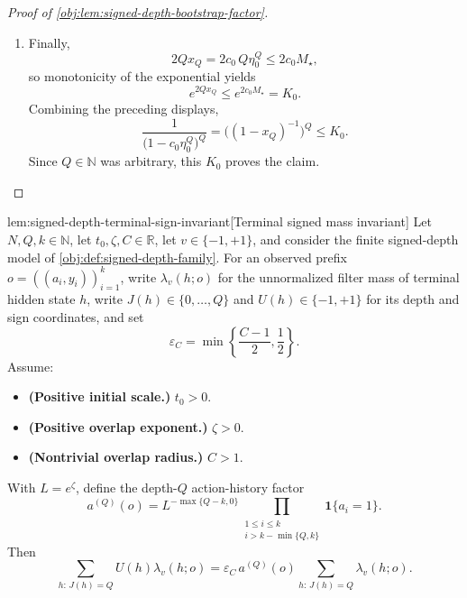\documentclass[11pt]{article}
\begin{document}
\begin{proof}[Proof of \cref{obj:lem:signed-depth-bootstrap-factor}]
\begin{enumerate}
\item Finally,
\[
        2Qx_Q=2c_0\,Q\eta_0^Q\le 2c_0M_\star,
\]
so monotonicity of the exponential yields
\[
        e^{2Qx_Q}\le e^{2c_0M_\star}=K_0.
\]
Combining the preceding displays,
\[
\frac{1}{\bigl(1-c_0\eta_0^Q\bigr)^Q}
=
\bigl((1-x_Q)^{-1}\bigr)^Q
\le
K_0.
\]
Since \(Q\in\mathbb N\) was arbitrary, this \(K_0\) proves the claim. %
\end{enumerate}
\end{proof}

\begin{lemmav}{lem:signed-depth-terminal-sign-invariant}[Terminal signed mass invariant]
Let \(N,Q,k\in\mathbb N\), let \(t_0,\zeta,C\in\mathbb R\), let \(v\in\{-1,+1\}\), and consider the finite signed-depth model of \cref{obj:def:signed-depth-family}.  For an observed prefix \(o=((a_i,y_i))_{i=1}^k\), write \(\lambda_v(h;o)\) for the unnormalized filter mass of terminal hidden state \(h\), write \(J(h)\in\{0,\ldots,Q\}\) and \(U(h)\in\{-1,+1\}\) for its depth and sign coordinates, and set
\[
\varepsilon_C=\min\left\{\frac{C-1}{2},\frac12\right\}.
\]
Assume:
\begin{itemize}
\item \textbf{(Positive initial scale.)} \(t_0>0\).
\item \textbf{(Positive overlap exponent.)} \(\zeta>0\).
\item \textbf{(Nontrivial overlap radius.)} \(C>1\).
\end{itemize}
With \(L=e^\zeta\), define the depth-\(Q\) action-history factor
\[
a^{(Q)}(o)
=
L^{-\max\{Q-k,0\}}
\prod_{\substack{1\le i\le k\\ i>k-\min\{Q,k\}}}
\mathbf 1\{a_i=1\}.
\]
Then
\[
\sum_{h:\,J(h)=Q} U(h)\lambda_v(h;o)
=
\varepsilon_C\,a^{(Q)}(o)
\sum_{h:\,J(h)=Q}\lambda_v(h;o).
\]
\end{lemmav}
\end{document}
